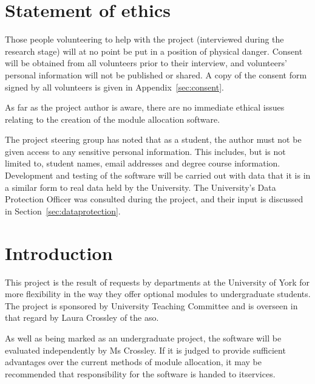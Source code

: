 \documentclass[]{scrartcl}
\begin{document}
\clearpage

\tableofcontents

\clearpage

\section{Statement of ethics}


Those people volunteering to help with the project (interviewed during the
research stage) will at no point be put in a position of physical danger.
Consent will be obtained from all volunteers prior to their interview, and
volunteers' personal information will not be published or shared. A copy of
the consent form signed by all volunteers is given in
Appendix~\ref{sec:consent}.


As far as the project author is aware, there are no immediate ethical issues
relating to the creation of the module allocation software.


The project steering group has noted that as a student, the author must not be
given access to any sensitive personal information. This includes, but is not
limited to, student names, email addresses and degree course information.
Development and testing of the software will be carried out with data that it
is in a similar form to real data held by the University. The University's
Data Protection Officer was consulted during the project, and their input is
discussed in Section~\ref{sec:dataprotection}.

\section{Introduction}


This project is the result of requests by departments at the University of
York for more flexibility in the way they offer optional modules to
undergraduate students. The project is sponsored by University Teaching
Committee and is overseen in that regard by Laura Crossley of the \gls{aso}.

As well as being marked as an undergraduate project, the software will be
evaluated independently by Ms Crossley. If it is judged to provide sufficient
advantages over the current methods of module allocation, it may be
recommended that responsibility for the software is handed to \gls{itservices}.
\end{document}
